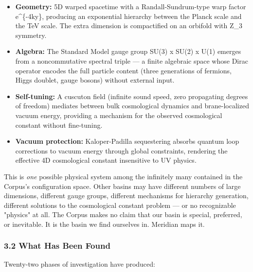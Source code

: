 \begin{itemize}[nosep,leftmargin=*]
  \item \textbf{Geometry:} 5D warped spacetime with a Randall-Sundrum-type warp factor e\textasciicircum{}\{-4ky\}, producing an exponential hierarchy between the Planck scale and the TeV scale. The extra dimension is compactified on an orbifold with Z\_3 symmetry.
  \item \textbf{Algebra:} The Standard Model gauge group SU(3) x SU(2) x U(1) emerges from a noncommutative spectral triple — a finite algebraic space whose Dirac operator encodes the full particle content (three generations of fermions, Higgs doublet, gauge bosons) without external input.
  \item \textbf{Self-tuning:} A cuscuton field (infinite sound speed, zero propagating degrees of freedom) mediates between bulk cosmological dynamics and brane-localized vacuum energy, providing a mechanism for the observed cosmological constant without fine-tuning.
  \item \textbf{Vacuum protection:} Kaloper-Padilla sequestering absorbs quantum loop corrections to vacuum energy through global constraints, rendering the effective 4D cosmological constant insensitive to UV physics.
\end{itemize}


This is \textit{one} possible physical system among the infinitely many contained in the Corpus's configuration space. Other basins may have different numbers of large dimensions, different gauge groups, different mechanisms for hierarchy generation, different solutions to the cosmological constant problem — or no recognizable "physics" at all. The Corpus makes no claim that our basin is special, preferred, or inevitable. It is the basin we find ourselves in. Meridian maps it.


\subsubsection*{3.2 What Has Been Found}


Twenty-two phases of investigation have produced:


